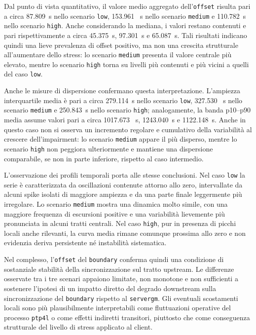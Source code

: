 Dal punto di vista quantitativo, il valore medio aggregato dell'\texttt{offset}
risulta pari a circa 87.809~\textmu s nello scenario \texttt{low}, 153.961~\textmu
s nello scenario \texttt{medium} e 110.782~\textmu s nello scenario \texttt{high}.
Anche considerando la mediana, i valori restano contenuti e pari rispettivamente
a circa 45.375~\textmu s, 97.301~\textmu s e 65.087~\textmu s. Tali risultati
indicano quindi una lieve prevalenza di offset positivo, ma non una crescita strutturale
all'aumentare dello stress: lo scenario \texttt{medium} presenta il valore centrale
più elevato, mentre lo scenario \texttt{high} torna su livelli più contenuti e più
vicini a quelli del caso \texttt{low}.

Anche le misure di dispersione confermano questa interpretazione. L'ampiezza interquartile
media è pari a circa 279.114~\textmu s nello scenario \texttt{low}, 327.530~\textmu
s nello scenario \texttt{medium} e 250.843~\textmu s nello scenario \texttt{high};
analogamente, la banda p10--p90 media assume valori pari a circa 1017.673~\textmu
s, 1243.040~\textmu s e 1122.148~\textmu s. Anche in questo caso non si osserva
un incremento regolare e cumulativo della variabilità al crescere dell'impairment:
lo scenario \texttt{medium} appare il più disperso, mentre lo scenario \texttt{high}
non peggiora ulteriormente e mantiene una dispersione comparabile, se non in parte
inferiore, rispetto al caso intermedio.

L'osservazione dei profili temporali porta alle stesse conclusioni. Nel caso \texttt{low}
la serie è caratterizzata da oscillazioni contenute attorno allo zero, intervallate
da alcuni spike isolati di maggiore ampiezza e da una parte finale leggermente più
irregolare. Lo scenario \texttt{medium} mostra una dinamica molto simile, con
una maggiore frequenza di escursioni positive e una variabilità lievemente più
pronunciata in alcuni tratti centrali. Nel caso \texttt{high}, pur in presenza di
picchi locali anche rilevanti, la curva media rimane comunque prossima allo zero
e non evidenzia deriva persistente né instabilità sistematica.

Nel complesso, l'\texttt{offset} del \texttt{boundary} conferma quindi una condizione
di sostanziale stabilità della sincronizzazione sul tratto upstream. Le
differenze osservate tra i tre scenari appaiono limitate, non monotone e non sufficienti
a sostenere l'ipotesi di un impatto diretto del degrado downstream sulla sincronizzazione
del \texttt{boundary} rispetto al \texttt{servergm}. Gli eventuali scostamenti
locali sono più plausibilmente interpretabili come fluttuazioni operative del
processo \texttt{ptp4l} o come effetti indiretti transitori, piuttosto che come
conseguenza strutturale del livello di stress applicato al client.

